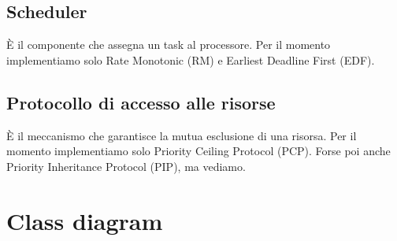 \subsection{Scheduler}
È il componente che assegna un task al processore. Per il momento implementiamo solo Rate Monotonic (RM) e Earliest Deadline First (EDF).

\subsection{Protocollo di accesso alle risorse}
È il meccanismo che garantisce la mutua esclusione di una risorsa. Per il momento implementiamo solo Priority Ceiling Protocol (PCP). Forse poi anche Priority Inheritance Protocol (PIP), ma vediamo.

\section{Class diagram}